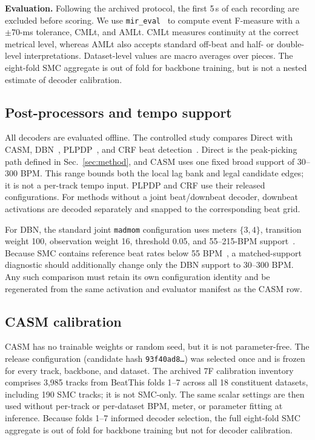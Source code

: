 \documentclass{article}
\begin{document}
\textbf{Evaluation.} Following the archived protocol, the first 5\,s of each recording are excluded before scoring. We use \texttt{mir\_eval}~\cite{raffel2014mireval} to compute event F-measure with a $\pm70$-ms tolerance, CMLt, and AMLt. CMLt measures continuity at the correct metrical level, whereas AMLt also accepts standard off-beat and half- or double-level interpretations. Dataset-level values are macro averages over pieces. The eight-fold SMC aggregate is out of fold for backbone training, but is not a nested estimate of decoder calibration.


\subsection{Post-processors and tempo support}
All decoders are evaluated offline. The controlled study compares Direct with CASM, DBN~\cite{krebs2015dbn}, PLPDP~\cite{chiu2023localperiodicity}, and CRF beat detection~\cite{korzeniowski2014crf}. Direct is the peak-picking path defined in Sec.~\ref{sec:method}, and CASM uses one fixed broad support of 30--300 BPM. This range bounds both the local lag bank and legal candidate edges; it is not a per-track tempo input. PLPDP and CRF use their released configurations. For methods without a joint beat/downbeat decoder, downbeat activations are decoded separately and snapped to the corresponding beat grid.

For DBN, the standard joint \texttt{madmom} configuration uses meters $\{3,4\}$, transition weight 100, observation weight 16, threshold 0.05, and 55--215-BPM support~\cite{krebs2015dbn}. Because SMC contains reference beat rates below 55 BPM~\cite{ahn2026smcblindspot}, a matched-support diagnostic should additionally change only the DBN support to 30--300 BPM. Any such comparison must retain its own configuration identity and be regenerated from the same activation and evaluator manifest as the CASM row.

\subsection{CASM calibration}
CASM has no trainable weights or random seed, but it is not parameter-free. The release configuration (candidate hash \texttt{93f40ad8\ldots}) was selected once and is frozen for every track, backbone, and dataset. The archived 7F calibration inventory comprises 3,985 tracks from BeatThis folds 1--7 across all 18 constituent datasets, including 190 SMC tracks; it is not SMC-only. The same scalar settings are then used without per-track or per-dataset BPM, meter, or parameter fitting at inference. Because folds 1--7 informed decoder selection, the full eight-fold SMC aggregate is out of fold for backbone training but not for decoder calibration.
\end{document}
